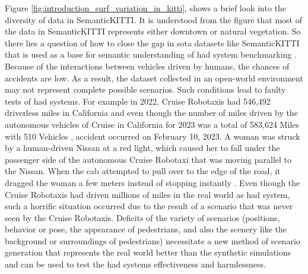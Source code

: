 Figure \ref{fig:introduction_surf_variation_in_kitti}, shows a brief look into the diversity of data in SemanticKITTI. It is understood from the figure that most of the data in SemanticKITTI represents either downtown or natural vegetation. So there lies a question of how to close the gap in \acrfull{sota} datasets like SemanticKITTI that is used as a base for semantic understanding of \acrshort{had} system benchmarking \parencite{papers-with-code}. Because of the interactions between vehicles driven by humans, the chances of accidents are low. As a result, the dataset collected in an open-world environment may not represent complete possible scenarios. Such conditions lead to faulty tests of \acrshort{had} systems. For example in 2022, Cruise Robotaxis had 546,492 driverless miles in California and even though the number of miles driven by the autonomous vehicles of Cruise in California for 2023 was a total of 583,624 Miles with 510 Vehicles \parencite{disengagement_report}, accident occurred on February 10, 2023. A woman was struck by a human-driven Nissan at a red light, which caused her to fall under the passenger side of the autonomous Cruise Robotaxi that was moving parallel to the Nissan. When the cab attempted to pull over to the edge of the road, it dragged the woman a few meters instead of stopping instantly \parencite{cruise_crash}. Even though the Cruise Robotaxis had driven millions of miles in the real world as \acrshort{had} system, such a horrific situation occurred due to the result of a scenario that was never seen by the Cruise Robotaxis. Deficits of the variety of scenarios (positions, behavior or pose, the appearance of pedestrians, and also the scenery like the background or surroundings of pedestrians) necessitate a new method of scenario generation that represents the real world better than the synthetic simulations and can be used to test the \acrshort{had} systems effectiveness and harmlessness.

